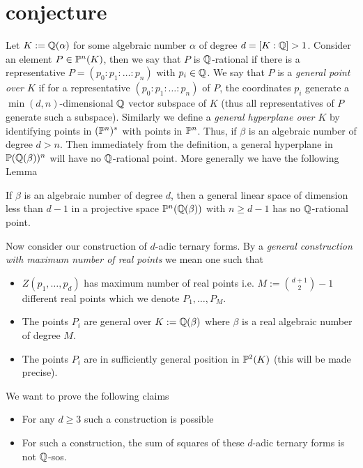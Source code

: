 \section{conjecture}

Let $K:= \Q(\alpha)$ for some algebraic number $\alpha$ of degree $d=[K:\Q]>1$. 
Consider an element $P\in\P^n(K)$, then we say that $P$ is $\Q$-rational if there is a representative
$P=(p_0:p_1:\dots:p_n)$ with $p_i \in \Q$. We say that $P$ is a {\it general point over $K$} if for a 
representative $(p_0:p_1:\dots :p_n)$ of $P$, the coordinates $p_i$ generate a $\min(d,n)$-dimensional $\Q$ vector 
subspace of $K$ (thus all representatives of $P$ generate such a subspace). Similarly we define a {\it general 
hyperplane over $K$} by identifying points in $(\P^n)^*$ with points in $\P^n$. Thus, if $\beta$ is an algebraic 
number of degree $d>n$. Then immediately from the definition, a general hyperplane in $\P(\Q(\beta))^n$ will have no 
$\Q$-rational point. More generally we have the following Lemma

\begin{lemma}\label{l-qrational}
If $\beta$ is an algebraic number of degree $d$, then a general linear space of 
dimension less than $d-1$ in a projective space $\P^n(\Q(\beta))$ with $n\ge d-1$ has no $\Q$-rational point.
\end{lemma}

Now consider our construction of $d$-adic ternary forms. By a {\it general construction with maximum number of real 
points} we mean one such that 
\begin{itemize}
\item $Z(p_1,\dots, p_d)$ has maximum number of real points i.e. $M:=\binom{d+1}2-1$ different real points which we 
denote $P_1,\dots, P_M$.
\item The points $P_i$ are general over $K:=\Q(\beta)$ where $\beta$ is a real algebraic number of degree $M$.
\item The points $P_i$ are in sufficiently general position in $\P^2(K)$ (this will be made precise).
\end{itemize}

We want to prove the following claims 
\begin{itemize}
\item For any $d\ge 3$ such a construction is possible 
\item For such a construction, the sum of squares of these $d$-adic ternary forms is not $\Q$-sos.
\end{itemize}

